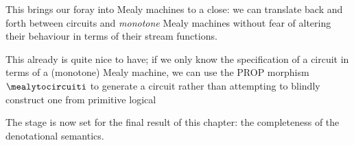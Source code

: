 This brings our foray into Mealy machines to a close: we can translate back and
forth between circuits and \emph{monotone} Mealy machines without fear of
altering their behaviour in terms of their stream functions.

This already is quite nice to have; if we only know the specification of a
circuit in terms of a (monotone) Mealy machine, we can use the PROP morphism
\(\mealytocircuiti\) to generate a circuit rather than attempting to blindly
construct one from primitive logical

The stage is now set for the final result of this chapter: the completeness of
the denotational semantics.